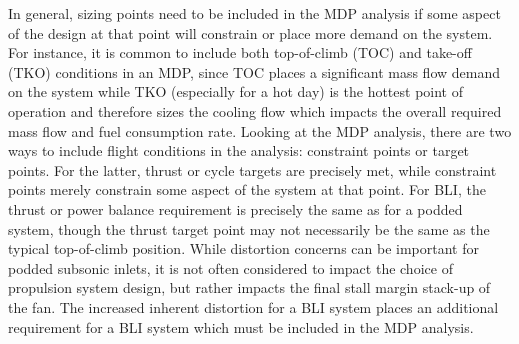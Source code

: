 		\vspace{1pt}
		\vspace{5mm}
		
		In general, sizing points need to be included in the MDP analysis if some aspect of the design at that point will  constrain or place more demand on the system.  For instance, it is common to include both top-of-climb (TOC) and take-off (TKO) conditions in an MDP, since TOC places a significant mass flow demand on the system while TKO (especially for a hot day) is the hottest point of operation and therefore sizes the cooling flow which impacts the overall required mass flow and fuel consumption rate.  Looking at the MDP analysis, there are two ways to include flight conditions in the analysis:  constraint points or target points.  For the latter, thrust or cycle targets are precisely met, while constraint points merely constrain some aspect of the system at that point.  For BLI, the thrust or power balance requirement is precisely the same as for a podded system, though the thrust target point may not necessarily be the same as the typical top-of-climb position.  While distortion concerns can be important for podded subsonic inlets, it is not often considered to impact the choice of propulsion system design, but rather impacts the final stall margin stack-up of the fan.  The increased inherent distortion for a BLI system places an additional requirement for a BLI system which must be included in the MDP analysis.
		
